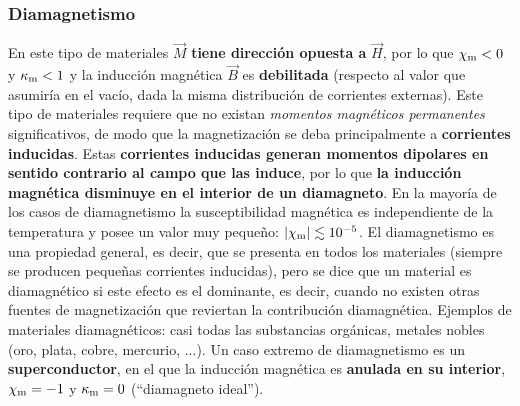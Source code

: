 \subsubsection{Diamagnetismo}
En este tipo de materiales $\vec{M}$ \textbf{tiene dirección opuesta a}  $\vec{H}$, por lo que $\chi_{\rm m}<0$ y $\kappa_{\rm m}<1$ y la inducción magnética $\vec{B}$ es \textbf{debilitada} (respecto al valor que asumiría en el vacío, dada la misma distribución de corrientes externas). Este tipo de materiales requiere que no existan \textit{momentos magnéticos permanentes} significativos, de modo que la magnetización se deba principalmente a \textbf{corrientes inducidas}. Estas \textbf{corrientes inducidas generan momentos dipolares en sentido contrario al campo que las induce}, por lo que \textbf{la inducción magnética disminuye en el interior de un diamagneto}. En la mayoría de los casos de diamagnetismo la susceptibilidad magnética es independiente de la
temperatura y posee un valor muy pequeño: $|\chi_{\rm m}|\lesssim 10^{-5}$. El
diamagnetismo es una propiedad general, es decir, que se presenta en todos los
materiales (siempre se producen pequeñas corrientes inducidas), pero se dice
que un material es diamagnético si este efecto es el dominante, es decir,
cuando no existen otras fuentes de magnetización que reviertan la contribución diamagnética.
Ejemplos de materiales diamagnéticos: casi todas las substancias orgánicas,
metales nobles (oro, plata, cobre, mercurio, ...). Un caso extremo de
diamagnetismo es un \textbf{superconductor}, en el que la inducción magnética
es \textbf{anulada en su interior}, $\chi_{\rm m}=-1$ y $\kappa_{\rm m}=0$ (``diamagneto ideal'').

